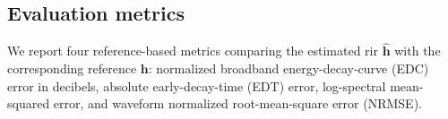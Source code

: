 \documentclass{article}
\begin{document}






\subsection{Evaluation metrics}
\label{sec:metrics}

We report four reference-based metrics comparing the estimated \ac{rir}
$\widehat{\mathbf{h}}$ with the corresponding reference $\mathbf{h}$:
normalized broadband energy-decay-curve (EDC) error in decibels, absolute
early-decay-time (EDT) error, log-spectral mean-squared error, and waveform
normalized root-mean-square error (NRMSE).
\end{document}
